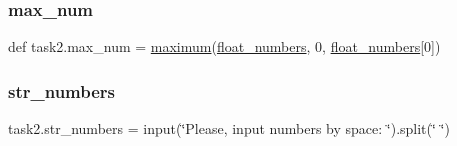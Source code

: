 \mbox{\label{namespacetask2_a6be05602bf574a03f0308429ac474e97}} 
\subsubsection{\texorpdfstring{max\+\_\+num}{max\_num}}
{\footnotesize\ttfamily def task2.\+max\+\_\+num = \hyperlink{namespacetask2_aa94c3ce489fe794dd806b09fe421e570}{maximum}(\hyperlink{namespacetask2_a4a4aea5068f8e25b43a1da9687dc3d67}{float\+\_\+numbers}, 0, \hyperlink{namespacetask2_a4a4aea5068f8e25b43a1da9687dc3d67}{float\+\_\+numbers}\mbox{[}0\mbox{]})}

\mbox{\label{namespacetask2_aee44793e4ddf40f20f98530ae0b2fa1c}} 
\subsubsection{\texorpdfstring{str\+\_\+numbers}{str\_numbers}}
{\footnotesize\ttfamily task2.\+str\+\_\+numbers = input(\char`\"{}Please, input numbers by space\+: \char`\"{}).split(\char`\"{} \char`\"{})}

